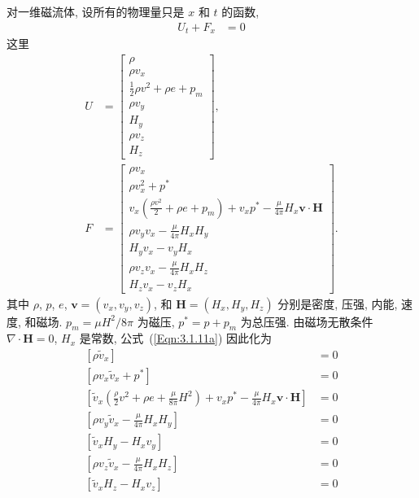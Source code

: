 \documentclass{article}
\begin{document}
对一维磁流体, 设所有的物理量只是 $x$ 和 $t$ 的函数,
\begin{align}
U_t + F_x &= 0 \label{Eqn:6.1.1}
\end{align}
这里
\begin{align}
U &= \left[\begin{array}{c}
\rho \\
\rho v_x \\
\frac{1}{2} \rho v^2 + \rho e + p_m \\
\rho v_y \\
H_y \\
\rho v_z \\
H_z
\end{array}\right], \label{Eqn:6.1.2a}
\\
F &= \left[\begin{array}{l}
\rho v_x \\
\rho v_x^2 + p^* \\
v_x \left( \frac{\rho v^2}{2} + \rho e + p_m \right) + v_x p^* - \frac{\mu}{4\pi} H_x \boldsymbol{v} \cdot \boldsymbol{H} \\
\rho v_y v_x - \frac{\mu}{4\pi} H_x H_y \\
H_y v_x - v_y H_x \\
\rho v_z v_x - \frac{\mu}{4\pi} H_x H_z \\
H_z v_x - v_z H_x
\end{array}\right]. \label{Eqn:6.1.2b}
\end{align}
其中 $\rho$, $p$, $e$, $\boldsymbol{v} = (v_x, v_y, v_z)$, 和 $\boldsymbol{H} = (H_x, H_y, H_z)$ 分别是密度, 压强, 内能, 速度, 和磁场. $p_m = \mu H^2/8\pi$ 为磁压, $p^* = p + p_m$ 为总压强. 由磁场无散条件 $\nabla \cdot \boldsymbol{H} = 0$, $H_x$ 是常数, 公式~(\ref{Eqn:3.1.11a}) 因此化为
\begin{align}
\left[ \rho \tilde v_x \right] &= 0 \label{Eqn:6.1.3}
\\
\left[ \rho v_x \tilde v_x + p^* \right] &= 0
\\
\left[\tilde v_x \left( \frac{\rho}{2} v^2 + \rho e + \frac{\mu}{8\pi} H^2 \right) +
v_x p^* -
\frac{\mu}{4\pi} H_x \boldsymbol{v} \cdot \boldsymbol{H} \right] &= 0 \label{Eqn:6.1.6}
\\
\left[ \rho v_y \tilde v_x - \frac{\mu}{4\pi} H_x H_y \right] &= 0
\\
\left[ \tilde v_x H_y - H_x v_y \right] &= 0 \label{Eqn:6.1.8}
\\
\left[ \rho v_z \tilde v_x - \frac{\mu}{4\pi} H_x H_z \right] &= 0
\\
\left[ \tilde v_x H_z - H_x v_z \right] &= 0 \label{Eqn:6.1.10}
\end{align}
\end{document}

